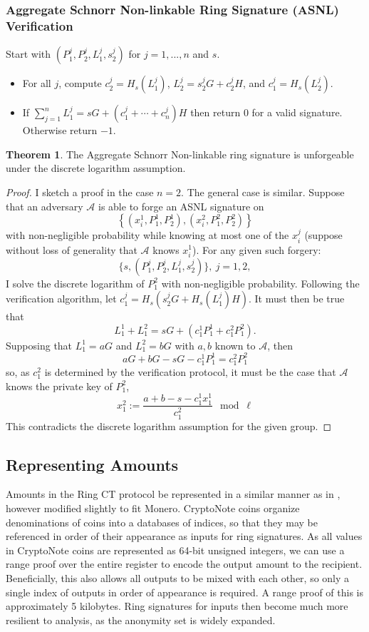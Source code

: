 \documentclass[12pt,english]{mrl}
\theoremstyle{definition}
\newtheorem{thm}[lem]{Theorem}
\numberwithin{equation}{section}
\numberwithin{figure}{section}
\numberwithin{equation}{section}
\numberwithin{equation}{section}
\numberwithin{figure}{section}
\begin{document}
\subsubsection{ Aggregate Schnorr Non-linkable Ring Signature (ASNL) Verification}
Start with $(P_1^j, P_2^j, L_1^j, s_2^j)$ for $j=1,...,n$ and $s$. 
\begin{itemize}
 \item For all $j$, compute $c_2^j = H_s (L_1^j)$, $L_2^j = s_2^j G + c_2^j H$, and $c_1^j = H_s(L_2^j)$. 
 \item If $\sum_{j=1}^n L_1^j = s G + (c_1^j + \cdots + c_n^j) H$ then return $0$ for a valid signature.  Otherwise return $-1$. 
\end{itemize}
 \begin{thm}
 The Aggregate Schnorr Non-linkable ring signature is unforgeable under the discrete logarithm assumption.  
 \end{thm}
\begin{proof}
 I sketch a proof in the case $n=2$. The general case is similar. Suppose that an adversary $\mathcal{A}$ is able to forge an ASNL signature on 
\[
  \left\{ (x_i^1, P_1^1, P_2^1), (x_i^2, P_1^2, P_2^2) \right\}
 \]
 with non-negligible probability while knowing at most one of the $x_i^j$ (suppose without loss of generality that $\mathcal{A}$ knows $x_i^1$). For any given such forgery:
 \[
  \{s,(P_1^j, P_2^j, L_1^j, s_2^j)\},\ j=1,2,
 \]
I solve the discrete logarithm of $P_1^2$ with non-negligible probability. Following the verification algorithm, let $c_1^j = H_s\left(s_2^j G + H_s(L_1^j)H\right)$. It must then be true that 
\[
 L_1^1 + L_1^2 = sG + \left(c_1^1 P_1^1 + c_1^2 P_1^2\right).
\]
Supposing that $L_1^1 = a G$ and $L_1^2 = bG$ with $a,b$ known to $\mathcal{A}$, then 
\[ 
 aG + bG - sG - c_1^1 P_1^1 = c_1^2 P_1^2
\]
so, as $c_1^2$ is determined by the verification protocol, it must be the case that $\mathcal{A}$ knows the private key of $P_1^2$, 
\[
 x_1^2 := \frac{a+b-s-c_1^1 x_1^1}{c_1^2} \mod \ell
\]
 This contradicts the discrete logarithm assumption for the given group. 
\end{proof}
\subsection{Representing Amounts }
Amounts in the Ring CT protocol be represented in a similar manner as in \cite{GM}, however modified slightly to fit Monero.
CryptoNote coins organize denominations of coins into a databases of indices, so that they may be referenced in order of their appearance as inputs for ring signatures. As all values in CryptoNote coins are represented as 64-bit unsigned integers, we can use a range proof over the entire register to encode the output amount to the recipient. Beneficially, this also allows all outputs to be mixed with each other, so only a single index of outputs in order of appearance is required. A range proof of this is approximately 5 kilobytes. Ring signatures for inputs then become much more resilient to analysis, as the anonymity set is widely expanded.
\end{document}
